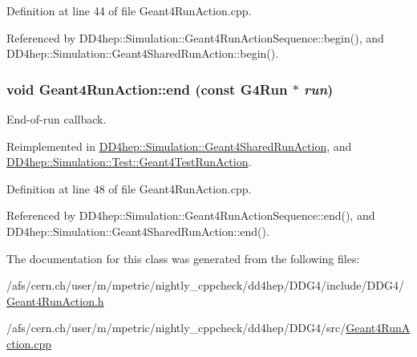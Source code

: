 Definition at line 44 of file Geant4RunAction.cpp.

Referenced by DD4hep::Simulation::Geant4RunActionSequence::begin(), and DD4hep::Simulation::Geant4SharedRunAction::begin().\hypertarget{class_d_d4hep_1_1_simulation_1_1_geant4_run_action_a71c7dbfb3451a9d6cc594f0174a631a2}{
\subsubsection[{end}]{\setlength{\rightskip}{0pt plus 5cm}void Geant4RunAction::end (const G4Run $\ast$ {\em run})}}
\label{class_d_d4hep_1_1_simulation_1_1_geant4_run_action_a71c7dbfb3451a9d6cc594f0174a631a2}


End-\/of-\/run callback. 

Reimplemented in \hyperlink{class_d_d4hep_1_1_simulation_1_1_geant4_shared_run_action_af723af818fd7798e910dcfef30092345}{DD4hep::Simulation::Geant4SharedRunAction}, and \hyperlink{class_d_d4hep_1_1_simulation_1_1_test_1_1_geant4_test_run_action_a9cffefeecef4c952ad1fbbc80893aac8}{DD4hep::Simulation::Test::Geant4TestRunAction}.

Definition at line 48 of file Geant4RunAction.cpp.

Referenced by DD4hep::Simulation::Geant4RunActionSequence::end(), and DD4hep::Simulation::Geant4SharedRunAction::end().

The documentation for this class was generated from the following files:\begin{DoxyCompactItemize}
\item 
/afs/cern.ch/user/m/mpetric/nightly\_\-cppcheck/dd4hep/DDG4/include/DDG4/\hyperlink{_geant4_run_action_8h}{Geant4RunAction.h}\item 
/afs/cern.ch/user/m/mpetric/nightly\_\-cppcheck/dd4hep/DDG4/src/\hyperlink{_geant4_run_action_8cpp}{Geant4RunAction.cpp}\end{DoxyCompactItemize}
